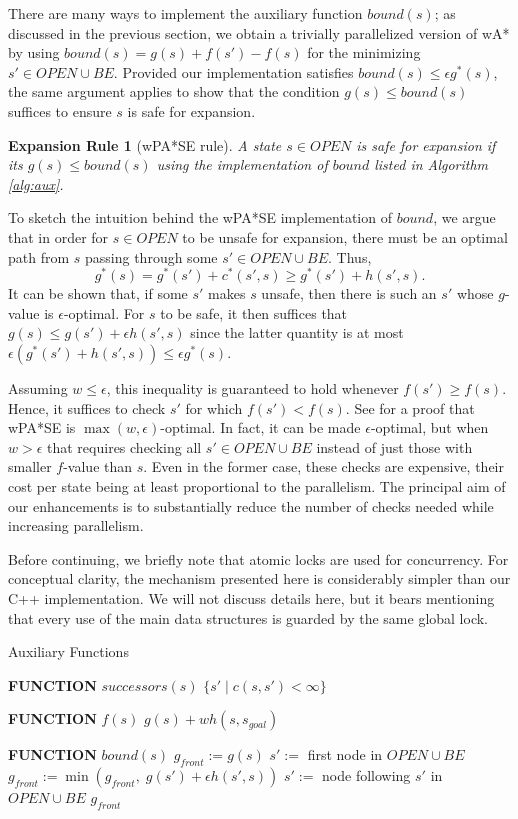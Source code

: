 \documentclass[letterpaper]{article}
\newtheorem{rul}{Expansion Rule}
\begin{document}
There are many ways to implement the auxiliary function $bound(s)$; as discussed in the previous section, we obtain a trivially parallelized version of wA* by using $bound(s) = g(s) + f(s') - f(s)$ for the minimizing $s'\in OPEN \cup BE$. Provided our implementation satisfies $bound(s) \le \epsilon g^*(s)$, the same argument applies to show that the condition $g(s) \le bound(s)$ suffices to ensure $s$ is safe for expansion.

\begin{rul}[wPA*SE rule]
A state $s\in OPEN$ is safe for expansion if its $g(s) \le bound(s)$ using the implementation of $bound$ listed in Algorithm \ref{alg:aux}.
\end{rul}

To sketch the intuition behind the wPA*SE implementation of $bound$, we argue that in order for $s\in OPEN$ to be unsafe for expansion, there must be an optimal path from $s$ passing through some $s'\in OPEN\cup BE$. Thus,
\[g^*(s) = g^*(s') + c^*(s',s) \ge g^*(s') + h(s',s).\]
It can be shown that, if some $s'$ makes $s$ unsafe, then there is such an $s'$ whose $g$-value is $\epsilon$-optimal. For $s$ to be safe, it then suffices that $g(s) \le g(s') + \epsilon h(s', s)$ since the latter quantity is at most $\epsilon (g^*(s') + h(s',s)) \le \epsilon g^*(s)$.

Assuming $w \le \epsilon$, this inequality is guaranteed to hold whenever $f(s') \ge f(s)$. Hence, it suffices to check $s'$ for which $f(s') < f(s)$. See \cite{} for a proof that wPA*SE is $\max(w, \epsilon)$-optimal. In fact, it can be made $\epsilon$-optimal, but when $w > \epsilon$ that requires checking  all $s'\in OPEN\cup BE$ instead of just those with smaller $f$-value than $s$. Even in the former case, these checks are expensive, their cost per state being at least proportional to the parallelism. The principal aim of our enhancements is to substantially reduce the number of checks needed while increasing parallelism.

Before continuing, we briefly note that atomic locks are used for concurrency. For conceptual clarity, the mechanism presented here is considerably simpler than our C++ implementation. We will not discuss details here, but it bears mentioning that every use of the main data structures is guarded by the same global lock.

\begin{algorithm}
\caption{Auxiliary Functions}
\label{alg:aux}
\begin{algorithmic}
\STATE \textbf{FUNCTION} $successors(s)$
\RETURN $\{s' \mid c(s,s')<\infty\}$

\STATE \textbf{FUNCTION} $f(s)$
\RETURN $g(s) + wh(s,s_{goal})$

\STATE \textbf{FUNCTION} $bound(s)$
\STATE $g_{front} := g(s)$
\STATE $s' :=$ first node in $OPEN \cup BE$
\STATE $g_{front} := \min(g_{front},\;g(s') + \epsilon h(s',s))$
\STATE $s' :=$ node following $s'$ in $OPEN \cup BE$
\ENDWHILE
\RETURN $g_{front}$
\end{algorithmic}
\end{algorithm}
\end{document}
